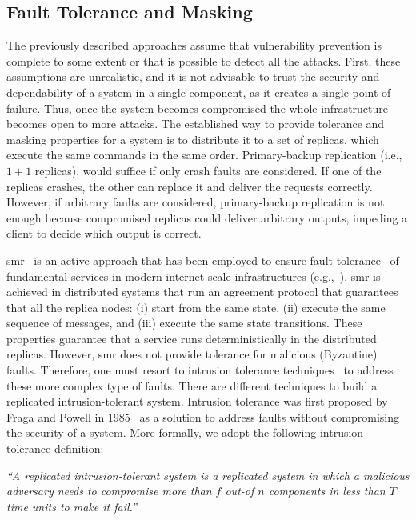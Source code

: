 \subsection{Fault Tolerance and Masking}
The previously described approaches assume that vulnerability prevention is complete to some extent or that is possible to detect all the attacks.
First, these assumptions are unrealistic, and it is not advisable to trust the security and dependability of a system in a single component, as it creates a single point-of-failure. 
Thus, once the system becomes compromised the whole infrastructure becomes open to more attacks. 
The established way to provide tolerance and masking properties for a system is to distribute it to a set of replicas, which execute the same commands in the same order. 
Primary-backup replication (i.e., $1 + 1$ replicas), would suffice if only crash faults are considered. 
If one of the replicas crashes, the other can replace it and deliver the requests correctly.
However, if arbitrary faults are considered, primary-backup replication is not enough because compromised replicas could deliver arbitrary outputs, impeding a client to decide which output is correct.

\gls{smr}~\cite{Lamport:1984} is an active approach that has been employed to ensure fault tolerance~\cite{Schneider:1990} of fundamental services in modern internet-scale infrastructures (e.g.,~\cite{Hunt:2010,Calder:2011,Corbett:2013}).
\gls{smr} is achieved in distributed systems that run an agreement protocol that guarantees that all the replica nodes: (i) start from the same state, (ii) execute the same sequence of messages, and (iii) execute the same state transitions. 
These properties guarantee that a service runs deterministically in the distributed replicas.
However, \gls{smr} does not provide tolerance for malicious (Byzantine) faults.
Therefore, one must resort to intrusion tolerance techniques~\cite{Verissimo:2003} to address these more complex type of faults.
There are different techniques to build a replicated intrusion-tolerant system.
Intrusion tolerance was first proposed by Fraga and Powell in 1985~\cite{Fraga:1985} as a solution to address faults without compromising the security of a system. 
More formally, we adopt the following intrusion tolerance definition: 

\begin{defn}
\emph{``A replicated intrusion-tolerant system is a replicated system in which a malicious adversary needs to compromise more than $f$ out-of $n$ components in less than $T$ time units to make it fail.''}~\cite{Bessani:2011}
\label{def:def2}
\end{defn}

